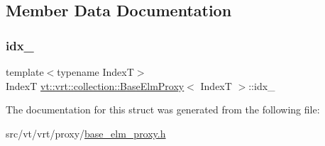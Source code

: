 \subsection{Member Data Documentation}
\mbox{\label{structvt_1_1vrt_1_1collection_1_1_base_elm_proxy_a7df61a27ad783255844eb2e87f83681b}} 
\subsubsection{\texorpdfstring{idx\+\_\+}{idx\_}}
{\footnotesize\ttfamily template$<$typename IndexT$>$ \\
IndexT \hyperlink{structvt_1_1vrt_1_1collection_1_1_base_elm_proxy}{vt\+::vrt\+::collection\+::\+Base\+Elm\+Proxy}$<$ IndexT $>$\+::idx\+\_\+\hspace{0.3cm}{\ttfamily [protected]}}



The documentation for this struct was generated from the following file\+:\begin{DoxyCompactItemize}
\item 
src/vt/vrt/proxy/\hyperlink{base__elm__proxy_8h}{base\+\_\+elm\+\_\+proxy.\+h}\end{DoxyCompactItemize}

